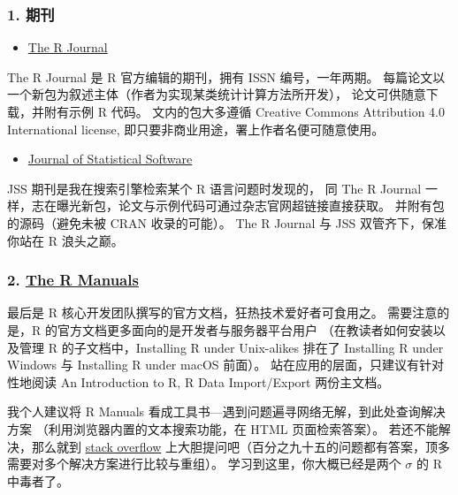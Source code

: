 \documentclass[11pt,hyperref]{ctexart}
\providecommand{\tightlist}{%
  \setlength{\itemsep}{0pt}\setlength{\parskip}{0pt}}
\begin{document}
\hypertarget{ux671fux520a}{%
\subsubsection{1. 期刊}\label{ux671fux520a}}

\begin{itemize}
\tightlist
\item
  \href{https://journal.r-project.org/}{The R Journal}
\end{itemize}

The R Journal 是 R 官方编辑的期刊，拥有 ISSN 编号，一年两期。
每篇论文以一个新包为叙述主体（作者为实现某类统计计算方法所开发），
论文可供随意下载，并附有示例 R 代码。 文内的包大多遵循 Creative Commons
Attribution 4.0 International license,
即只要非商业用途，署上作者名便可随意使用。

\begin{itemize}
\tightlist
\item
  \href{https://www.jstatsoft.org/index}{Journal of Statistical
  Software}
\end{itemize}

JSS 期刊是我在搜索引擎检索某个 R 语言问题时发现的， 同 The R Journal
一样，志在曝光新包，论文与示例代码可通过杂志官网超链接直接获取。
并附有包的源码（避免未被 CRAN 收录的可能）。 The R Journal 与 JSS
双管齐下，保准你站在 R 浪头之巅。

\hypertarget{the-r-manuals}{%
\subsubsection{\texorpdfstring{2.
\href{https://mirrors.tuna.tsinghua.edu.cn/CRAN/manuals.html}{The R
Manuals}}{2. The R Manuals}}\label{the-r-manuals}}

最后是 R 核心开发团队撰写的官方文档，狂热技术爱好者可食用之。
需要注意的是，R 的官方文档更多面向的是开发者与服务器平台用户
（在教读者如何安装以及管理 R 的子文档中，Installing R under Unix-alikes
排在了 Installing R under Windows 与 Installing R under macOS 前面）。
站在应用的层面，只建议有针对性地阅读 An Introduction to R, R Data
Import/Export 两份主文档。

我个人建议将 R Manuals
看成工具书---遇到问题遍寻网络无解，到此处查询解决方案
（利用浏览器内置的文本搜索功能，在 HTML 页面检索答案）。
若还不能解决，那么就到
\href{https://stackoverflow.com/questions/tagged/r}{stack overflow}
上大胆提问吧（百分之九十五的问题都有答案，顶多需要对多个解决方案进行比较与重组）。
学习到这里，你大概已经是两个 \(\sigma\) 的 R 中毒者了。
\end{document}
